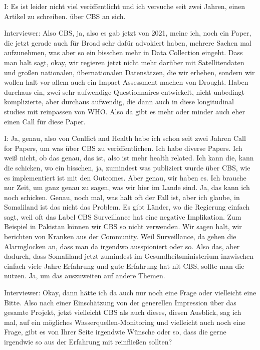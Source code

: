 I: Es ist leider nicht viel ver{\"o}ffentlicht und ich versuche seit zwei Jahren, einen Artikel zu schreiben. {\"u}ber CBS an sich.

Interviewer: Also CBS, ja, also es gab jetzt von 2021, meine ich, noch ein Paper, die jetzt gerade auch f{\"u}r Broad sehr daf{\"u}r advokiert haben, mehrere Sachen mal aufzunehmen, was aber so ein bisschen mehr in Data Collection eingeht. Dass man halt sagt, okay, wir regieren jetzt nicht mehr dar{\"u}ber mit Satellitendaten und großen nationalen, {\"u}bernationalen Datens{\"a}tzen, die wir erheben, sondern wir wollen halt vor allem auch ein Impact Assessment machen von Drought. Haben durchaus ein, zwei sehr aufwendige Questionnaires entwickelt, nicht unbedingt komplizierte, aber durchaus aufwendig, die dann auch in diese longitudinal studies mit reinpassen von WHO. Also da gibt es mehr oder minder auch eher einen Call f{\"u}r diese Paper. 

I: Ja, genau, also von Conlfict and Health habe ich schon seit zwei Jahren Call for Papers, um was {\"u}ber CBS zu ver{\"o}ffentlichen. Ich habe diverse Papers. Ich weiß nicht, ob das genau, das ist, also ist mehr health related. Ich kann die, kann die schicken, wo ein bisschen, ja, zumindest was publiziert wurde {\"u}ber CBS, wie es implementiert ist mit den Outcomes. Aber genau, wir haben es. Ich brauche nur Zeit, um ganz genau zu sagen, was wir hier im Lande sind. Ja, das kann ich noch schicken. Genau, noch mal, was halt oft der Fall ist, aber ich glaube, in Somaliland ist das nicht das Problem. Es gibt L{\"a}nder, wo die Regierung einfach sagt, weil oft das Label CBS Surveillance hat eine negative Implikation. Zum Beispiel in Pakistan k{\"o}nnen wir CBS so nicht verwenden. Wir sagen halt, wir berichten von Kranken aus der Community. Weil Surveillance, da gehen die Alarmglocken an, dass man da irgendwo ausspioniert oder so. Also das, aber dadurch, dass Somaliland jetzt zumindest im Gesundheitsministerium inzwischen einfach viele Jahre Erfahrung und gute Erfahrung hat nit CBS, sollte man die nutzen. Ja, um das auszuweiten auf andere Themen. 

Interviewer: Okay, dann h{\"a}tte ich da auch nur noch eine Frage oder vielleicht eine Bitte. Also nach einer Einsch{\"a}tzung von der generellen Impression {\"u}ber das gesamte Projekt, jetzt vielleicht CBS als auch dieses, diesen Ausblick, sag ich mal, auf ein m{\"o}gliches Wasserquellen-Monitoring und vielleicht auch noch eine Frage, gibt es von Ihrer Seite irgendwie W{\"u}nsche oder so, dass die gerne irgendwie so aus der Erfahrung mit reinfließen sollten?

